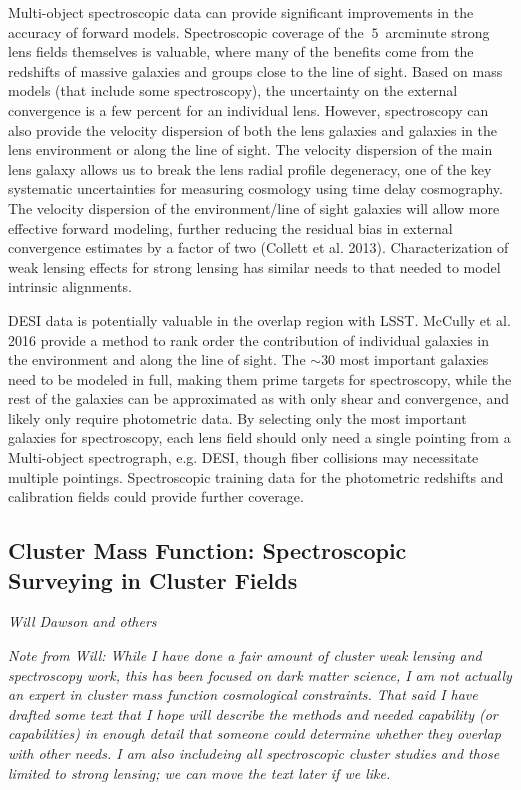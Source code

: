 Multi-object spectroscopic data can provide significant improvements in
the accuracy of forward models.
Spectroscopic coverage of the $~5$~arcminute strong lens fields
themselves is valuable, where many of the benefits come from the redshifts of
massive galaxies and groups close to the line of sight. Based on mass models (that include some spectroscopy), the uncertainty on the external convergence is a few percent for an individual lens. However, spectroscopy can also provide the velocity dispersion of both the lens galaxies and galaxies in the lens environment or along the line of sight. The velocity dispersion of the main lens galaxy allows us to break the lens radial profile degeneracy, one of the key systematic uncertainties for measuring cosmology using time delay cosmography. The velocity dispersion of the environment/line of sight galaxies will allow more effective forward modeling, further reducing the residual bias in external convergence estimates by a factor of two (Collett et al. 2013). Characterization of weak lensing effects for strong lensing has similar needs to that needed to model intrinsic alignments.


DESI data is potentially valuable in the overlap region with LSST. McCully et al. 2016 provide a method to rank order the contribution of individual galaxies in the environment and along the line of sight. The $\sim 30$ most important galaxies need to be modeled in full, making them prime targets for spectroscopy, while the rest of the galaxies can be approximated as with only shear and convergence, and likely only require photometric data. By selecting only the most important galaxies for spectroscopy, each lens field should only need a single pointing from a Multi-object spectrograph, e.g. DESI, though fiber collisions may necessitate multiple pointings. Spectroscopic training data for the photometric redshifts and calibration fields could provide further coverage.



\subsection{Cluster Mass Function: Spectroscopic Surveying in Cluster Fields}
\label{sec:sl:clusters}
{\it Will Dawson and others}

{\it Note from Will: While I have done a fair amount of cluster weak lensing and
spectroscopy work, this has been focused on dark matter science, I am not
actually an expert in cluster mass function cosmological constraints. That said
I have drafted some text that I hope will describe the methods and needed
capability (or capabilities) in enough detail that someone could determine
whether they overlap with other needs. I am also includeing all spectroscopic
cluster studies and those limited to strong lensing; we can move the text later
if we like.}

